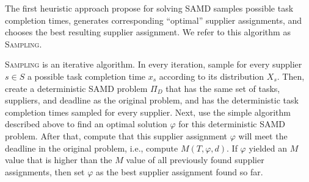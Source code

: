\documentclass[letterpaper]{article} %
\newcommand{\samd}{\ac{SAMD}\xspace}
\newcommand{\sampling}{\textsc{Sampling}\xspace}
\begin{document}
The first heuristic approach  propose for solving \samd samples possible task completion times, generates corresponding ``optimal'' supplier assignments, and chooses the best resulting supplier assignment. We refer to this algorithm as \sampling.


\sampling is an iterative algorithm.
In every iteration,  sample for every supplier $s\in S$ a possible task completion time $x_s$ according to its distribution $X_s$.
Then,  create a deterministic \samd problem $\Pi_D$ that has the same set of tasks, suppliers, and deadline as the original problem, and has the deterministic task completion times sampled for every supplier. Next,  use the simple algorithm described above to find an optimal solution $\varphi$ for this deterministic \samd problem. After that,  compute that this supplier assignment $\varphi$ will meet the deadline in the original problem, i.e.,  compute $M(T,\varphi,d)$. If $\varphi$ yielded an $M$ value that is higher than the $M$ value of all previously found supplier assignments, then  set $\varphi$ as the best supplier assignment found so far.



\end{document}
